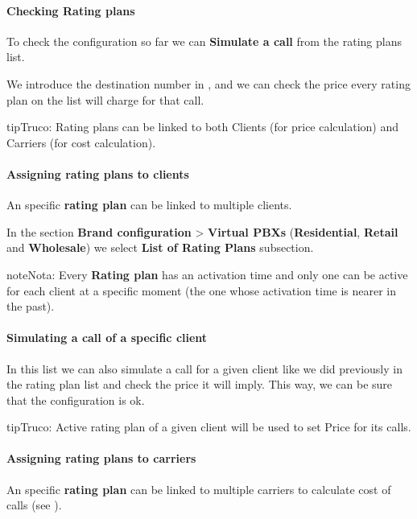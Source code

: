\documentclass[letterpaper,10pt,spanish]{sphinxmanual}
\begin{document}
\paragraph{Checking Rating plans}

To check the configuration so far we can \textbf{Simulate a call} from the rating plans list.

We introduce the destination number in {\hyperref[administration_portal/brand/settings/numeric_transformations:e164]{}}, and we can check the price every rating plan on the
list will charge for that call.

\begin{notice}{tip}{Truco:}
Rating plans can be linked to both Clients (for price calculation) and Carriers (for cost calculation).
\end{notice}


\paragraph{Assigning rating plans to clients}
\label{administration_portal/brand/billing/rating_plans:assigning-rating-plans-to-clients}
An specific \textbf{rating plan} can be linked to multiple clients.

In the section \textbf{Brand configuration} \textgreater{} \textbf{Virtual PBXs} (\textbf{Residential}, \textbf{Retail} and \textbf{Wholesale}) we select
\textbf{List of Rating Plans} subsection.

\begin{notice}{note}{Nota:}
Every \textbf{Rating plan} has an activation time and only one can be active for each
client at a specific moment (the one whose activation time is nearer in the past).
\end{notice}
\paragraph{Simulating a call of a specific client}

In this list we can also simulate a call for a given client like we did previously
in the rating plan list and check the price it will imply. This way, we can be sure
that the configuration is ok.

\begin{notice}{tip}{Truco:}
Active rating plan of a given client will be used to set Price for its calls.
\end{notice}


\paragraph{Assigning rating plans to carriers}
\label{administration_portal/brand/billing/rating_plans:assigning-rating-plans-to-carriers}
An specific \textbf{rating plan} can be linked to multiple carriers to calculate cost of calls (see {\hyperref[administration_portal/brand/providers/carriers:cost\string-calculation]{}}).
\end{document}
